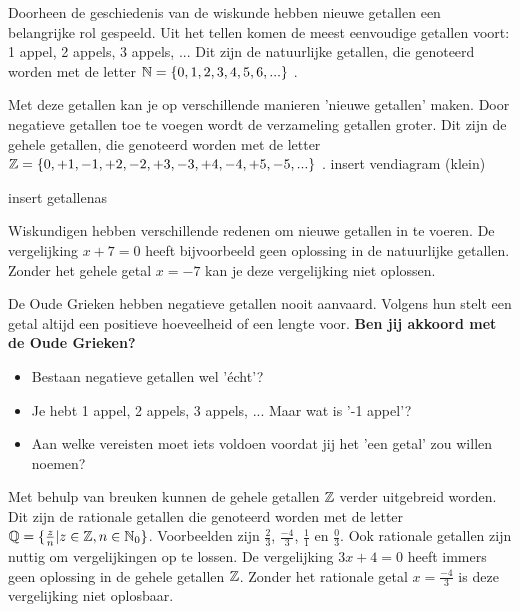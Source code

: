 \documentclass{ximera}
\begin{document}
    \author{Kwinten Obbels}

Doorheen de geschiedenis van de wiskunde hebben nieuwe getallen een belangrijke rol gespeeld.
Uit het tellen komen de meest eenvoudige getallen voort: 1 appel, 2 appels, 3 appels, ... 
Dit zijn de natuurlijke getallen, die genoteerd worden met de letter \( \mathbb{N} = \{0, 1, 2, 3, 4, 5, 6, ...\} \) . 





Met deze getallen kan je op verschillende manieren 'nieuwe getallen' maken. 
Door negatieve getallen toe te voegen wordt de verzameling getallen groter.  
Dit zijn de gehele getallen, die genoteerd worden met de letter  \( \mathbb{Z} = \{0, +1,-1,+2,-2,+3,-3,+4,-4,+5,-5, ... \} \) . 
insert vendiagram (klein)

insert getallenas 

Wiskundigen hebben verschillende redenen om nieuwe getallen in te voeren. 
De vergelijking \(x + 7 = 0\) heeft bijvoorbeeld geen oplossing in de natuurlijke getallen.
Zonder het gehele getal \(x = -7\) kan je deze vergelijking niet oplossen. 



\begin{denkvraag*}{}
    De Oude Grieken hebben negatieve getallen nooit aanvaard. 
    Volgens hun stelt een getal altijd een positieve hoeveelheid of een lengte voor. 
    \textbf{Ben jij akkoord met de Oude Grieken?}
\begin{itemize}
    \item Bestaan negatieve getallen wel 'écht'? 
    \item Je hebt 1 appel, 2 appels, 3 appels, ... Maar wat is '-1 appel'? 
    \item Aan welke vereisten moet iets voldoen voordat jij het 'een getal' zou willen noemen? 
\end{itemize}
\end{denkvraag*}

Met behulp van breuken kunnen de gehele getallen \(\mathbb{Z} \) verder uitgebreid worden. 
Dit zijn de rationale getallen die genoteerd worden met de letter \( \mathbb{Q}  = \{\frac{z}{n} | z \in \mathbb{Z}, n \in \mathbb{N}_0 \}\).
Voorbeelden zijn \(\frac{2}{3}\), \(\frac{-4}{3}\), \(\frac{1}{1}\) en \(\frac{0}{3}\). 
Ook rationale getallen zijn nuttig om vergelijkingen op te lossen. 
De vergelijking \(3x + 4 = 0\) heeft immers geen oplossing in de gehele getallen \( \mathbb{Z} \).
Zonder het rationale getal \(x = \frac{-4}{3}\) is deze vergelijking niet oplosbaar. 
\end{document}
